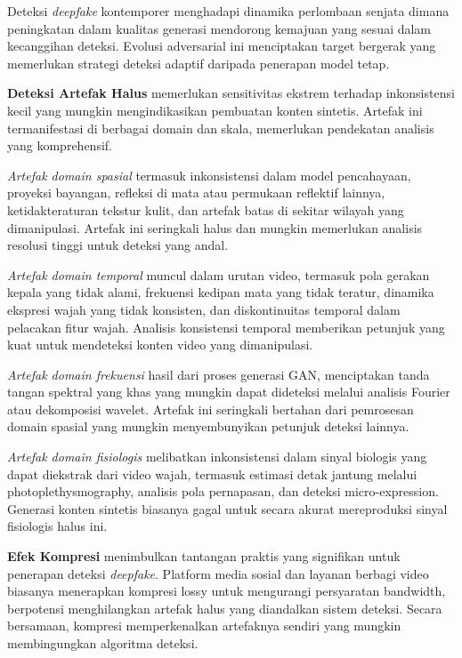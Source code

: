 Deteksi \textit{deepfake} kontemporer menghadapi dinamika perlombaan senjata dimana peningkatan dalam kualitas generasi mendorong kemajuan yang sesuai dalam kecanggihan deteksi. Evolusi adversarial ini menciptakan target bergerak yang memerlukan strategi deteksi adaptif daripada penerapan model tetap.

\textbf{Deteksi Artefak Halus} memerlukan sensitivitas ekstrem terhadap inkonsistensi kecil yang mungkin mengindikasikan pembuatan konten sintetis. Artefak ini termanifestasi di berbagai domain dan skala, memerlukan pendekatan analisis yang komprehensif.

\textit{Artefak domain spasial} termasuk inkonsistensi dalam model pencahayaan, proyeksi bayangan, refleksi di mata atau permukaan reflektif lainnya, ketidakteraturan tekstur kulit, dan artefak batas di sekitar wilayah yang dimanipulasi. Artefak ini seringkali halus dan mungkin memerlukan analisis resolusi tinggi untuk deteksi yang andal.

\textit{Artefak domain temporal} muncul dalam urutan video, termasuk pola gerakan kepala yang tidak alami, frekuensi kedipan mata yang tidak teratur, dinamika ekspresi wajah yang tidak konsisten, dan diskontinuitas temporal dalam pelacakan fitur wajah. Analisis konsistensi temporal memberikan petunjuk yang kuat untuk mendeteksi konten video yang dimanipulasi.

\textit{Artefak domain frekuensi} hasil dari proses generasi GAN, menciptakan tanda tangan spektral yang khas yang mungkin dapat dideteksi melalui analisis Fourier atau dekomposisi wavelet. Artefak ini seringkali bertahan dari pemrosesan domain spasial yang mungkin menyembunyikan petunjuk deteksi lainnya.

\textit{Artefak domain fisiologis} melibatkan inkonsistensi dalam sinyal biologis yang dapat diekstrak dari video wajah, termasuk estimasi detak jantung melalui photoplethysmography, analisis pola pernapasan, dan deteksi micro-expression. Generasi konten sintetis biasanya gagal untuk secara akurat mereproduksi sinyal fisiologis halus ini.

\textbf{Efek Kompresi} menimbulkan tantangan praktis yang signifikan untuk penerapan deteksi \textit{deepfake}. Platform media sosial dan layanan berbagi video biasanya menerapkan kompresi lossy untuk mengurangi persyaratan bandwidth, berpotensi menghilangkan artefak halus yang diandalkan sistem deteksi. Secara bersamaan, kompresi memperkenalkan artefaknya sendiri yang mungkin membingungkan algoritma deteksi.

